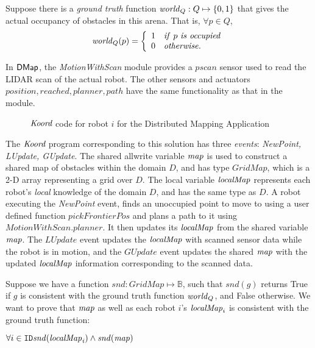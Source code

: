 Suppose there is a \emph{ground truth} function $\mathit{world}_Q : Q \mapsto \left\{0,1\right\}$ that gives the actual occupancy of obstacles in this arena. That is, $\forall p \in Q$,
\begin{align}
\mathit{world}_Q(p) =
		\left\{
		\begin{array}{ll}
			1 & \mathit{if}\ p \ \mathit{is \ occupied}\\
			0 & \mathit{otherwise}.
		\end{array}
		\right.
\end{align}

\newcommand{\MotionWithScan}{\emph{MotionWithScan}\xspace}

In ${\sf DMap}$, the \MotionWithScan module provides a $\mathit{pscan}$ sensor used to read the LIDAR scan of the actual robot. The other sensors and actuators $\mathit{position,reached,planner,path}$ have the same functionality as that in the \Motion module.

\begin{figure}[t]
    {
    
    }
    {
    
    }
    \caption{ $\emph{Koord}$ code for robot $i$ for the Distributed Mapping Application}
    \label{fig:mapapp }
\end{figure}

 The $\emph{Koord}$ program corresponding to this solution has three \emph{events}: \emph{NewPoint, LUpdate, GUpdate}. The shared allwrite variable $\mathit{map}$ is used to construct a shared map of obstacles within the domain $D$, and has type $\mathit{GridMap}$, which is a 2-D array representing a grid over $D$. The local variable $\mathit{localMap}$ represents each robot's \emph{local} knowledge of the domain $D$, and has the same type as $D$. A robot executing the \emph{NewPoint} event, finds an unoccupied point to move to using a user defined function $\mathit{pickFrontierPos}$ and plans a path to it using $\mathit{MotionWithScan.planner}$. It then updates its $\mathit{localMap}$ from the shared variable $\mathit{map}$. The $\mathit{LUpdate}$ event updates the $\mathit{localMap}$ with scanned sensor data while the robot is in motion, and the $\mathit{GUpdate}$ event updates the shared $\mathit{map}$ with the updated $\mathit{localMap}$ information corresponding to the scanned data.


Suppose we have a function $\mathit{snd}: GridMap \mapsto \mathbb{B}$, such that $\mathit{snd}(g)$ returns True if $g$ is consistent with the ground truth function $\mathit{world}_Q$, and False otherwise. We want to prove that $\mathit{map}$ as well as each robot $i$'s $\mathit{localMap}_i$ is consistent with the ground truth function:
\begin{invariant}
    \label{inv:mapping}
    $\forall i \in \texttt{ID} \mathit{snd(\mathit{localMap}_i)} \wedge \mathit{snd(\mathit{map})}$
\end{invariant}

